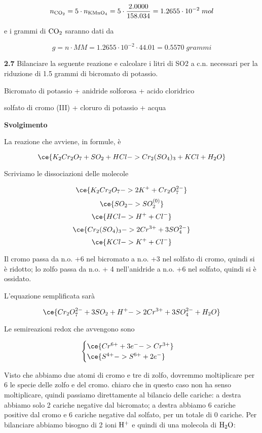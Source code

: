 $$n_{\rm CO_2}=5 \cdot n_{\rm KMnO_4}
=5 \cdot \frac{2.0000}{158.034}
=1.2655 \cdot 10^{-2}\;mol$$

e i grammi di $\rm CO_2$ saranno dati da

$$g=n \cdot MM=1.2655 \cdot 10^{-2} \cdot 44.01
=0.5570\;grammi$$

\vspace{0.2cm}\textbf{2.7} Bilanciare la seguente reazione e calcolare i litri di SO2 a c.n. necessari per la riduzione di 1.5
grammi di bicromato di potassio.

\begin{center}
    Bicromato di potassio + anidride solforosa + acido cloridrico \ce{->}

    \ce{->} solfato di cromo (III) + cloruro di potassio + acqua
\end{center}

\large\textbf{Svolgimento}\normalsize

\vspace{0.2cm}La reazione che avviene, in formule, è

$$\ce{K_2Cr_2O_7 + SO_2 + HCl -> Cr_2(SO_4)_3 + KCl + H_2O}$$

Scriviamo le dissociazioni delle molecole

$$\ce{K_2Cr_2O_7 -> 2K^+ + Cr_2O_7^{2-}}$$
$$\ce{SO_2 -> SO_2^{(0)}}$$
$$\ce{HCl -> H^+ + Cl^-}$$
$$\ce{Cr_2(SO_4)_3 -> 2Cr^{3+} + 3SO_4^{2-}}$$
$$\ce{KCl -> K^+ + Cl^-}$$

Il cromo passa da n.o. +6 nel bicromato a n.o. +3 nel solfato di cromo, quindi si è ridotto; lo zolfo passa da n.o. + 4 nell'anidride a n.o. +6 nel solfato, quindi si è ossidato.

L'equazione semplificata sarà

$$\ce{Cr_2O_7^{2-} + 3SO_2 + H^+ -> 2Cr^{3+} + 3SO_4^{2-} + H_2O}$$

Le semireazioni redox che avvengono sono

$$\begin{cases}
    \ce{Cr^{6+} +3e^- -> Cr^{3+}}\\
    \ce{S^{4+} -> S^{6+} +2e^-}
\end{cases}$$

Visto che abbiamo due atomi di cromo e tre di zolfo, dovremmo moltiplicare per 6 le specie delle zolfo e del cromo. \E chiaro che in questo caso non ha senso moltiplicare, quindi passiamo direttamente al bilancio delle cariche: a destra abbiamo solo 2 cariche negative dal bicromato; a destra abbiamo 6 cariche positive dal cromo e 6 cariche negative dal solfato, per un totale di 0 cariche. Per bilanciare abbiamo bisogno di 2 ioni $\rm H^+$ e quindi di una molecola di $\rm H_2O$:


